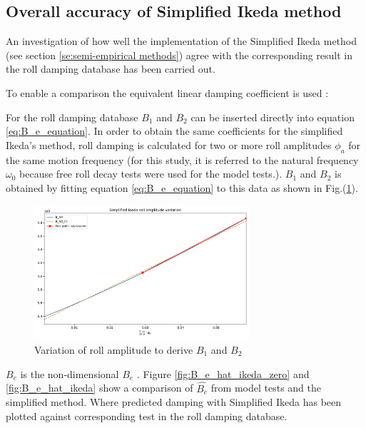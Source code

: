 \subsection{Overall accuracy of Simplified Ikeda method}
\label{se:overall_comparison}
An investigation of how well the implementation of the Simplified Ikeda method (see section \ref{se:semi-empirical methods}) agree with the corresponding result in the roll damping database has been carried out. 

To enable a comparison the equivalent linear damping coefficient is used \parencite{himeno_prediction_1981}:


For the roll damping database $B_1$ and $B_2$ can be inserted directly into equation  \ref{eq:B_e_equation}. 
In order to obtain the same coefficients for the simplified Ikeda's method, roll damping is calculated for two or more roll amplitudes $\phi_a$ for the same motion frequency (for this study, it is referred to the natural frequency $\omega_0$ because free roll decay tests were used for the model tests.). $B_1$ and $B_2$ is obtained by fitting equation \ref{eq:B_e_equation} to this data as shown in Fig.(\ref{fig:ikeda_B_1_B2}).  

\begin{figure}[H]
    \centering
    \includegraphics[height=5cm, width=8cm]{figures/ikeda_B_1_B_2.pdf}
    \vspace{-0.5cm}
    \caption{Variation of roll amplitude to derive $B_1$ and $B_2$}
    \label{fig:ikeda_B_1_B2}
\end{figure}

$\hat{B_e}$ is the non-dimensional $B_e$ \parencite{himeno_prediction_1981}.
Figure \ref{fig:B_e_hat_ikeda_zero} and \ref{fig:B_e_hat_ikeda} show a comparison of $\hat{B_e}$ 
from model tests and the simplified method. Where predicted damping with Simplified Ikeda has been plotted against corresponding test in the roll damping database.  

